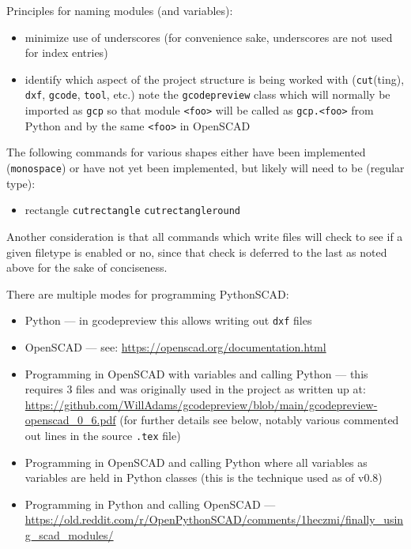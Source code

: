 \documentclass{ltxdoc}
\begin{document}
Principles for naming modules (and variables):

\begin{itemize}
\item minimize use of underscores (for convenience sake, underscores are not used for index entries)
\item identify which aspect of the project structure is being worked with (\texttt{cut}(ting), 
      \texttt{dxf}, \texttt{gcode}, \texttt{tool}, etc.) note the \verb|gcodepreview| class which will 
      normally be imported as \verb|gcp| so that module \verb|<foo>| will be called as
      \verb|gcp.<foo>| from Python and by the same \verb|<foo>| in OpenSCAD
\end{itemize}


The following commands for various shapes either have been implemented (\verb|monospace|) or have not yet been implemented, but likely will need to be (regular type):

\begin{itemize}
\item rectangle
\subitem \texttt{cutrectangle}
\subitem \texttt{cutrectangleround}
\end{itemize}


Another consideration is that all commands which write files will check to see if a given filetype is enabled or no, since that check is deferred to the last as noted above for the sake of conciseness.

There are multiple modes for programming PythonSCAD:

\begin{itemize}
\item Python --- in gcodepreview this allows writing out \verb|dxf| files
\item OpenSCAD --- see: \url{https://openscad.org/documentation.html}
\item Programming in OpenSCAD with variables and calling Python --- this requires 3 files and was originally used in the project as written up at: \url{https://github.com/WillAdams/gcodepreview/blob/main/gcodepreview-openscad_0_6.pdf} (for further details see below, notably various commented out lines in the source \verb|.tex| file)
\item Programming in OpenSCAD and calling Python where all variables as variables are held in Python classes (this is the technique used as of v0.8)
\item Programming in Python and calling OpenSCAD --- \url{https://old.reddit.com/r/OpenPythonSCAD/comments/1heczmi/finally_using_scad_modules/}
\end{itemize}
\end{document}
